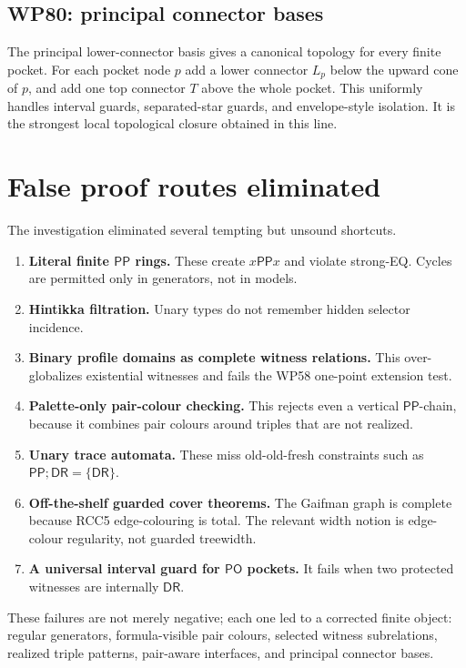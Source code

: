 \documentclass[11pt]{article}
\newcommand{\PP}{\mathsf{PP}}
\newcommand{\PO}{\mathsf{PO}}
\newcommand{\DR}{\mathsf{DR}}
\begin{document}
\subsection{WP80: principal connector bases}

The principal lower-connector basis gives a canonical topology for every finite pocket.  For each pocket node $p$ add a lower connector $L_p$ below the upward cone of $p$, and add one top connector $T$ above the whole pocket.  This uniformly handles interval guards, separated-star guards, and envelope-style isolation.  It is the strongest local topological closure obtained in this line.

\section{False proof routes eliminated}

The investigation eliminated several tempting but unsound shortcuts.

\begin{enumerate}[label=(\arabic*)]
\item \textbf{Literal finite $\PP$ rings.} These create $x\PP x$ and violate strong-EQ. Cycles are permitted only in generators, not in models.
\item \textbf{Hintikka filtration.} Unary types do not remember hidden selector incidence.
\item \textbf{Binary profile domains as complete witness relations.} This over-globalizes existential witnesses and fails the WP58 one-point extension test.
\item \textbf{Palette-only pair-colour checking.} This rejects even a vertical $\PP$-chain, because it combines pair colours around triples that are not realized.
\item \textbf{Unary trace automata.} These miss old-old-fresh constraints such as $\PP;\DR=\{\DR\}$.
\item \textbf{Off-the-shelf guarded cover theorems.} The Gaifman graph is complete because RCC5 edge-colouring is total. The relevant width notion is edge-colour regularity, not guarded treewidth.
\item \textbf{A universal interval guard for $\PO$ pockets.} It fails when two protected witnesses are internally $\DR$.
\end{enumerate}

These failures are not merely negative; each one led to a corrected finite object: regular generators, formula-visible pair colours, selected witness subrelations, realized triple patterns, pair-aware interfaces, and principal connector bases.
\end{document}

